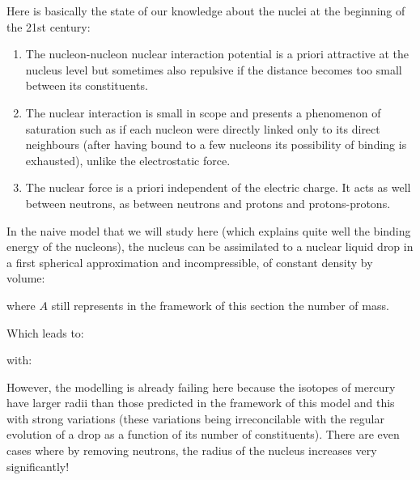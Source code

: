 	Here is basically the state of our knowledge about the nuclei at the beginning of the 21st century:
	\begin{enumerate}
		\item The nucleon-nucleon nuclear interaction potential is a priori attractive at the nucleus level but sometimes also repulsive if the distance becomes too small between its constituents.

		\item The nuclear interaction is small in scope and presents a phenomenon of saturation such as if each nucleon were directly linked only to its direct neighbours (after having bound to a few nucleons its possibility of binding is exhausted), unlike  the electrostatic force.

		\item The nuclear force is a priori independent of the electric charge. It acts as well between neutrons, as between neutrons and protons and protons-protons.
	\end{enumerate}
	In the naive model that we will study here (which explains quite well the binding energy of the nucleons), the nucleus can be assimilated to a nuclear liquid drop in a first spherical approximation and incompressible, of constant density by volume:
	
	where $A$ still represents in the framework of this section the number of mass.

	Which leads to:
	
	with:
	
	However, the modelling is already failing here because the isotopes of mercury have larger radii than those predicted in the framework of this model and this with strong variations (these variations being irreconcilable with the regular evolution of a drop as a function of its number of constituents). There are even cases where by removing neutrons, the radius of the nucleus increases very significantly!
	
